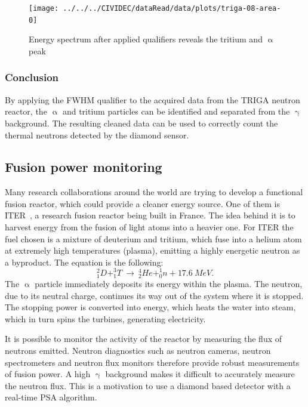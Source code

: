 \begin{figure}[!t]
\centering
\texttt{[image: ../../../CIVIDEC/dataRead/data/plots/triga-08-area-0]}
\caption{Energy spectrum after applied qualifiers reveals the tritium and $\upalpha$ peak}
\label{fig:areatriga0}
\end{figure}

\subsubsection{Conclusion}
By applying the FWHM qualifier to the acquired data from the TRIGA neutron reactor, the $\upalpha$ and tritium particles can be identified and separated from the $\upgamma$ background. The resulting cleaned data can be used to correctly count the thermal neutrons detected by the diamond sensor.












\subsection{Fusion power monitoring}
Many research collaborations around the world are trying to develop a functional fusion reactor, which could provide a cleaner energy source. One of them is ITER~\cite{ITER:00000}, a research fusion reactor being built in France. The idea behind it is to harvest energy from the fusion of light atoms into a heavier one. For ITER the fuel chosen is a mixture of deuterium and tritium, which fuse into a helium atom at extremely high temperatures (plasma), emitting a highly energetic neutron as a byproduct. The equation is the following:
\begin{equation}
^2_1D+^3_1T ~\rightarrow~ ^4_2He+^1_0n+17.6~MeV.
\end{equation}
The $\upalpha$ particle immediately deposits its energy within the plasma. The neutron, due to its neutral charge, continues its way out of the system where it is stopped. The stopping power is converted into energy, which heats the water into steam, which in turn spins the turbines, generating electricity.

It is possible to monitor the activity of the reactor by measuring the flux of neutrons emitted. Neutron diagnostics such as neutron cameras, neutron spectrometers and neutron flux monitors therefore provide robust measurements of fusion power. A high $\upgamma$ background makes it difficult to accurately measure the neutron flux. This is a motivation to use a diamond based detector with a real-time PSA algorithm.

